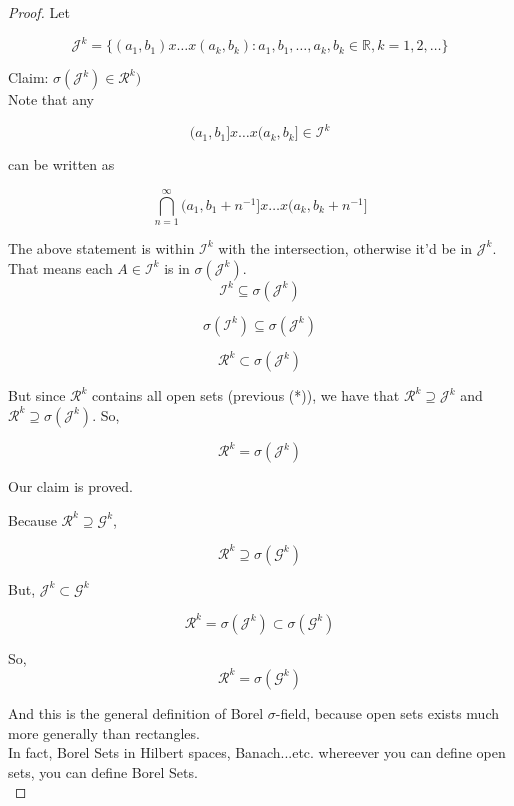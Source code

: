 \documentclass[11pt,fleqn]{book} %
\begin{document}
\begin{proof}
	Let

	$$\mathcal{J}^k = \{(a_1, b_1)x \dots x (a_k, b_k): a_1, b_1, \dots, a_k, b_k \in \mathbb{R}, k = 1, 2, \dots \} $$

	Claim: $\sigma(\mathcal{J}^k) \in \mathcal{R}^k)$\\


	Note that any

	$$(a_1, b_1]x \dots x (a_k, b_k] \in \mathcal{I}^k$$

	can be written as 

	$$\bigcap ^\infty_{n=1} (a_1, b_1 + n^{-1}] x \dots x (a_k, b_k + n^{-1}]  $$

	
		The above statement is within $\mathcal{I}^k$ with the intersection, otherwise it'd be in $\mathcal{J}^k$.\\

		That means each $A \in \mathcal{I}^k$ is in $\sigma(\mathcal{J}^k)$.\\

		$$\mathcal{I}^k \subseteq \sigma(\mathcal{J}^k) $$

		$$ \sigma(\mathcal{I}^k) \subseteq \sigma(\mathcal{J}^k)$$

		$$\mathcal{R}^k \subset\sigma(\mathcal{J}^k) $$

		But since $\mathcal{R}^k$ contains all open sets (previous (*)), we have that $\mathcal{R}^k \supseteq \mathcal{J}^k$ and $ \mathcal{R}^k \supseteq \sigma(\mathcal{J}^k)$. So, 

		$$\mathcal{R}^k = \sigma(\mathcal{J}^k) $$

		Our claim is proved. 

	Because $\mathcal{R}^k \supseteq \mathcal{G}^k$, 

	$$\mathcal{R}^k \supseteq \sigma(\mathcal{G}^k) $$

	But, $\mathcal{J}^k \subset \mathcal{G}^k$

		$$ \mathcal{R}^k = \sigma(\mathcal{J}^k) \subset \sigma(\mathcal{G}^k) $$

So, $$\mathcal{R}^k =  \sigma(\mathcal{G}^k) $$

And this is the general definition of Borel $\sigma$-field, because open sets exists much more generally than rectangles. \\

In fact, Borel Sets in Hilbert spaces, Banach...etc. whereever you can define open sets, you can define Borel Sets.\\
	
\end{proof}
\end{document}
